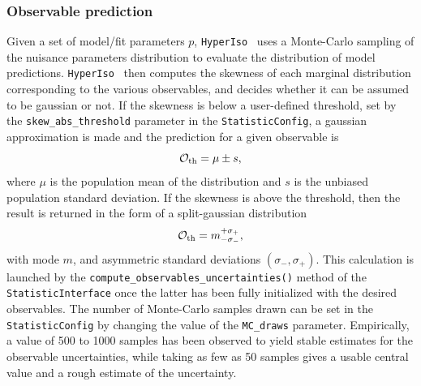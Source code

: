 \documentclass[preprint,11pt]{elsarticle}
\newcommand{\hi}{\texttt{HyperIso}}
\begin{document}
\subsubsection{Observable prediction}
Given a set of model/fit parameters $p$, \hi~ uses a Monte-Carlo sampling of the nuisance parameters distribution to evaluate the distribution of model predictions. \hi~ then computes the skewness of each marginal distribution corresponding to the various observables, and decides whether it can be assumed to be gaussian or not. If the skewness is below a user-defined threshold, set by the \texttt{skew\_abs\_threshold} parameter in the \texttt{StatisticConfig}, a gaussian approximation is made and the prediction for a given observable is
\begin{equation}
    \mathcal{O}_{\rm th}=\mu\pm s,
\end{equation}
where $\mu$ is the population mean of the distribution and $s$ is the unbiased population standard deviation. If the skewness is above the threshold, then the result is returned in the form of a split-gaussian distribution
\begin{equation}
    \mathcal{O}_{\rm th}=m^{+\sigma_+}_{-\sigma_-},
\end{equation}
with mode $m$, and asymmetric standard deviations $(\sigma_-,\sigma_+)$.\smallbreak
This calculation is launched by the \texttt{compute\_observables\_uncertainties()} method of the \texttt{StatisticInterface} once the latter has been fully initialized with the desired observables. The number of Monte-Carlo samples drawn can be set in the \texttt{StatisticConfig} by changing the value of the \texttt{MC\_draws} parameter. Empirically, a value of \num{500} to \num{1000} samples has been observed to yield stable estimates for the observable uncertainties, while taking as few as 50 samples gives a usable central value and a rough estimate of the uncertainty.
\end{document}

